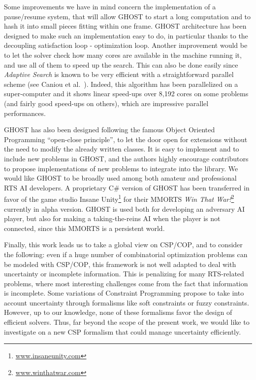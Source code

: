 \documentclass[journal]{IEEEtran}
\newcommand{\csp}{\textsc{CSP}\xspace}
\newcommand{\cop}{\textsc{COP}\xspace}
\newcommand{\ghost}{\textsc{GHOST}\xspace}
\begin{document}
Some  improvements we  have in  mind concern the implementation  of a
pause/resume system, that will allow  \ghost to start a  long computation and
to hash it into small pieces fitting  within one frame. %
\ghost architecture has been designed to make such an implementation
easy to do, in particular thanks to the decoupling satisfaction loop -
optimization loop. Another improvement would be to let the solver
check how many cores are available in the machine running it, and use
all of them to speed up the search. This can also be done easily since
{\it Adaptive Search} is known to be very efficient with a
straightforward parallel scheme (see Caniou et
al.~\cite{Caniou14}). Indeed, this algorithm has been parallelized on a
super-computer and it shows linear speed-ups over 8,192 cores on some
problems (and fairly good speed-ups on others), which are impressive
parallel performances.

\ghost has also been designed following the famous Object Oriented
Programming ``open-close principle'', to let the door open for
extensions without the need to modify the already written classes. It
is easy to implement and to include new problems in \ghost, and the
authors highly encourage contributors to propose implementations of
new problems to integrate into the library. We would like \ghost to be
broadly used among both amateur and professional RTS AI developers. A
proprietary C\# version of \ghost has been transferred in favor of the game
studio Insane
Unity\footnote{\href{http://www.insaneunity.com}{www.insaneunity.com}}
for their MMORTS \emph{Win That
  War!}\footnote{\href{http://www.winthatwar.com}{www.winthatwar.com}}
currently in alpha version. \ghost is used both for developing an
adversary AI player, but also for making a taking-the-reins AI when
the player is not connected, since this MMORTS is a persistent
world.


Finally, this work leads us to take a global view on \csp/\cop, and to
consider the  following: even  if a huge  number of  combinatorial optimization problems can be modeled with \csp/\cop, this framework is
not   well   adapted   to   deal  with   uncertainty   or   incomplete
information. This  is penalizing for many  RTS-related problems, where
most interesting challenges come  from the fact that information is
incomplete. Some variations of  Constraint Programming propose to take
into account  uncertainty through formalisms like  soft constraints or
fuzzy constraints. However, up to our  knowledge, none of these formalisms  favor the design
of efficient solvers. Thus, far beyond the scope
of  the present  work, we  would  like to  investigate on  a new  \csp
formalism that could manage uncertainty efficiently.
\end{document}
